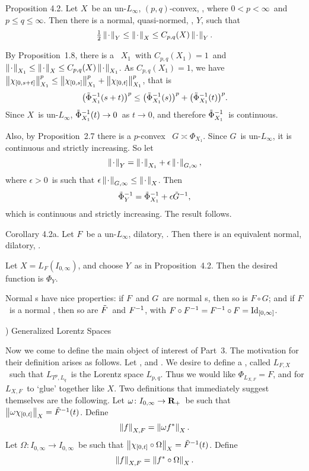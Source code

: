 \proclaim Proposition 4.2. Let $X$\ be an un-$L_\infty$, $(p,q)$-convex,
\ris\onIzi, where $0<p<\infty$\ and $p\le q\le\infty$. Then there
is a normal,
quasi-normed, \ris\onIzi, $Y$, such that
$$ {\textstyle {1\over2}}\left\| \kern0.8pt\cdot\kern0.8pt \right\|_Y \le \left\| \kern0.8pt\cdot\kern0.8pt \right\|_X \le C_{p,q}(X) \left\| \kern0.8pt\cdot\kern0.8pt \right\|_Y
.$$
 
\Proof By Proposition~1.8, there is a \ris\ $X_1$\ with $C_{p,q}(X_1)=1$\
and $\left\| \kern0.8pt\cdot\kern0.8pt \right\|_{X_1} \le \left\| \kern0.8pt\cdot\kern0.8pt \right\|_X \le C_{p,q}(X) \left\| \kern0.8pt\cdot\kern0.8pt \right\|_{X_1}$.
As
$C_{p,q}(X_1)=1$, we have
$\left\| \chi_{[0,s+t]} \right\|_{X_1}^p \le \left\| \chi_{[0,s]} \right\|_{X_1}^p
+
\left\| \chi_{[0,t]} \right\|_{X_1}^p $, that is
$$ \bigl(\tilde\Phi^{-1}_{X_1}(s+t)\bigr)^p \le \bigl(\tilde\Phi^{-1}_{X_1}(s)\bigr)^p
                                     + \bigl(\tilde\Phi^{-1}_{X_1}(t)\bigr)^p
.$$
Since $X$\ is un-$L_\infty$, $\tilde\Phi^{-1}_{X_1}(t)\to0$\ as $t\to0$,
and therefore
$\tilde\Phi^{-1}_{X_1}$\ is continuous.
 
Also, by Proposition~2.7 there is a $p$-convex \af\ $G\asymp \Phi_{X_1}$.
Since
$G$\ is un-$L_\infty$, it is continuous and strictly increasing.
So let
$$ \left\| \kern0.8pt\cdot\kern0.8pt \right\|_Y = \left\| \kern0.8pt\cdot\kern0.8pt \right\|_{X_1} + \epsilon\left\| \kern0.8pt\cdot\kern0.8pt \right\|_{G,\infty} ,$$
where $\epsilon>0$\ is such that $\epsilon\left\| \kern0.8pt\cdot\kern0.8pt \right\|_{G,\infty} \le
\left\| \kern0.8pt\cdot\kern0.8pt \right\|_X$. Then
$$ \tilde\Phi^{-1}_Y = \tilde\Phi^{-1}_{X_1} + \epsilon\tilde G^{-1} ,$$
which is continuous and strictly increasing. The result follows.
\endproof
 
\proclaim Corollary 4.2a. Let $F$\ be a un-$L_\infty$, dilatory,
\af. Then there
is an equivalent normal, dilatory, \af.
 
\Proof Let $X=L_F(I_{0,\infty})$, and choose $Y$\ as in Proposition~4.2.
Then
the desired function is $\Phi_Y$.
\endproof
 
Normal \af s have nice properties: if $F$\ and $G$\ are normal \af
s, then so
is $F\circ G$; and if $F$\ is a normal \af, then so are $\tilde F$\ and
$F^{-1}$, with
$F\circ F^{-1}=F^{-1}\circ F=\mathord{\rm Id}_{[0,\infty]}$.
 
\vfill
\eject
 
) Generalized Lorentz Spaces
 
Now we come to define the main object of interest of Part~3. The
motivation for their
definition arises as follows.
Let \Fbaaf, and \Xbaris\onIzi. We desire to define a \ris\onIzi,
called $L_{F,X}$\
such that $L_{T^p,L_q}$\ is the Lorentz space $L_{p,q}$. Thus we
would
like $\Phi_{L_{X,F}} = F$, and for $L_{X,F}$\ to `glue' together
like $X$. Two
definitions that immediately suggest themselves are the following.
\itemi Let $\omega\colon I_{0,\infty}\to{\bf R}_+$\ be such that
$\left\| \omega\chi_{[0,t]} \right\|_X = \tilde F^{-1}(t)$. Define
$$ \left\| f \right\|_{X,F} = \left\| \omega f^* \right\|_X .$$
\itemii Let $\Omega\colon I_{0,\infty}\to I_{0,\infty}$\ be such
that
$\left\| \chi_{[0,t]}\circ\Omega \right\|_X = \tilde F^{-1}(t)$. Define
$$ \left\| f \right\|_{X,F} = \left\| f^*\circ\Omega \right\|_X .$$
 
